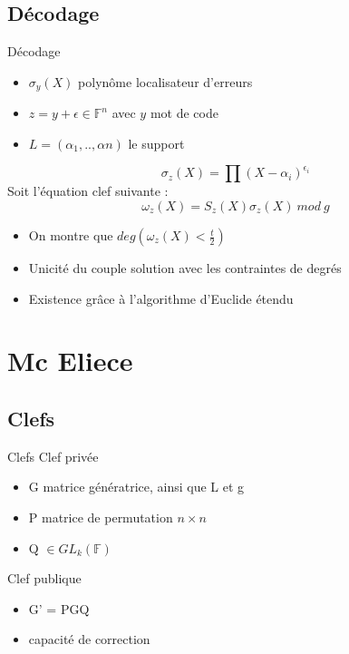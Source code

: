 \documentclass{beamer}
\begin{document}
		\subsection{Décodage}

			\begin{frame}{Décodage}
				\begin{itemize}
					\item $\sigma_{y}(X)$ polynôme localisateur d'erreurs
					\item $z = y + \epsilon \in \mathbb{F}^{n} $ avec $y$ mot de code
					\item $L = (\alpha_{1}, .. ,\alpha{n})$ le support
				\end{itemize}
				$$
					\sigma_{z}(X) = \prod (X-\alpha_{i})^{\epsilon_{i}}
				$$
				Soit l'équation clef suivante :
				$$
					\omega_{z}(X) = S_{z}(X) \sigma_{z}(X) \ mod \ g
				$$
				\begin{itemize}
					\item On montre que $deg(\omega_{z}(X) < \frac{t}{2}) $
					\item Unicité du couple solution avec les contraintes de degrés
					\item Existence grâce à l'algorithme d'Euclide étendu
				\end{itemize}

			\end{frame}

	\section{Mc Eliece}

		
		\subsection{Clefs}

			\begin{frame}{Clefs}
				Clef privée
				\begin{itemize}
					\item G matrice génératrice, ainsi que L et g
					\item P matrice de permutation $ n \times n$
					\item Q $\in GL_{k}(\mathbb{F})$
				\end{itemize}

				Clef publique
				\begin{itemize}
					\item G' = PGQ
					\item capacité de correction
				\end{itemize}
			
			\end{frame}
\end{document}
